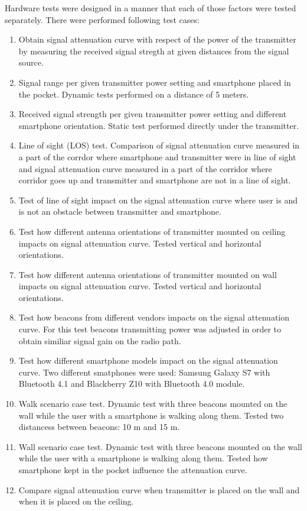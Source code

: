 \documentclass[../main.tex]{subfiles}
\begin{document}
Hardware tests were designed in a manner that each of those factors were tested separately. There were performed following test cases:

\begin{enumerate}
	\item Obtain signal attenuation curve with respect of the power of the transmitter by measuring the received signal stregth at given distances from the signal source.
	\item Signal range per given transmitter power setting and smartphone placed in the pocket. Dynamic tests performed on a distance of 5 meters.
	\item Received signal strength per given transmitter power setting and different smartphone orientation. Static test performed directly under the transmitter.
	\item Line of sight (LOS) test. Comparison of signal attenuation curve measured in a part of the corrdor where smartphone and transmitter were in line of sight and signal attenuation curve measured in a part of the corridor where corridor goes up and transmitter and smartphone are not in a line of sight.
	\item Test of line of sight impact on the signal attenuation curve where user is and is not an obstacle between transmitter and smartphone.
	\item Test how different antenna orientations of transmitter mounted on ceiling impacts on signal attenuation curve. Tested vertical and horizontal orientations.
	\item Test how different antenna orientations of transmitter mounted on wall impacts on signal attenuation curve. Tested vertical and horizontal orientations.
	\item Test how beacons from different vendors impacts on the signal attenuation curve. For this test beacons transmitting power was adjusted in order to obtain similiar signal gain on the radio path.
	\item Test how different smartphone models impact on the signal attenuation curve. Two different smatphones were used: Samsung Galaxy S7 with Bluetooth 4.1 and Blackberry Z10 with Bluetooth 4.0 module.
	\item Walk scenario case test. Dynamic test with three beacons mounted on the wall while the user with a smartphone is walking along them. Tested two distancess between beacons: 10 m and 15 m.
	\item Wall scenario case test. Dynamic test with three beacons mounted on the wall while the user with a smartphone is walking along them. Tested how smartphone kept in the pocket influence the attenuation curve.
	\item  Compare signal attenuation curve when transmitter is placed on the wall and when it is placed on the ceiling.


\end{enumerate}
\end{document}
